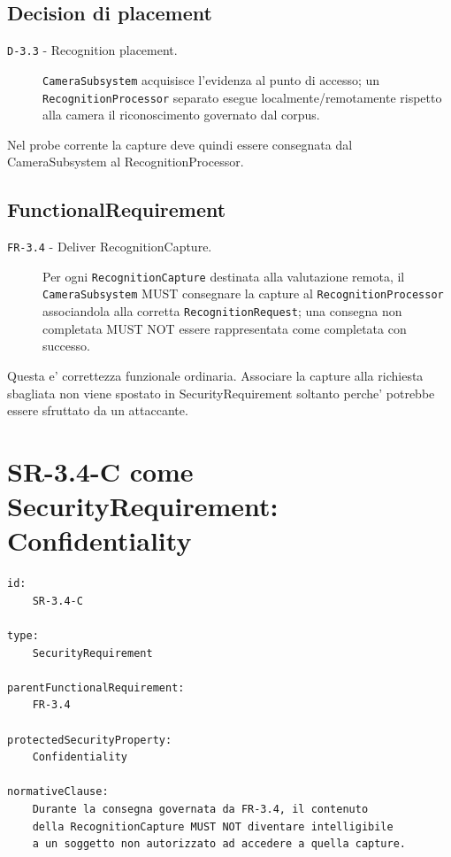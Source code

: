\documentclass[11pt,a4paper]{article}
\begin{document}
\subsection{Decision di placement}

\begin{description}
  \item[\texttt{D-3.3} - Recognition placement.] \texttt{CameraSubsystem} acquisisce l'evidenza al punto di accesso; un \texttt{RecognitionProcessor} separato esegue localmente/remotamente rispetto alla camera il riconoscimento governato dal corpus.
\end{description}

Nel probe corrente la capture deve quindi essere consegnata dal CameraSubsystem al RecognitionProcessor.

\subsection{FunctionalRequirement}

\begin{description}
  \item[\texttt{FR-3.4} - Deliver RecognitionCapture.] Per ogni \texttt{RecognitionCapture} destinata alla valutazione remota, il \texttt{CameraSubsystem} MUST consegnare la capture al \texttt{RecognitionProcessor} associandola alla corretta \texttt{RecognitionRequest}; una consegna non completata MUST NOT essere rappresentata come completata con successo.
\end{description}

Questa e' correttezza funzionale ordinaria. Associare la capture alla richiesta sbagliata non viene spostato in SecurityRequirement soltanto perche' potrebbe essere sfruttato da un attaccante.

\section{SR-3.4-C come SecurityRequirement: Confidentiality}

\begin{lstlisting}
id:
    SR-3.4-C

type:
    SecurityRequirement

parentFunctionalRequirement:
    FR-3.4

protectedSecurityProperty:
    Confidentiality

normativeClause:
    Durante la consegna governata da FR-3.4, il contenuto
    della RecognitionCapture MUST NOT diventare intelligibile
    a un soggetto non autorizzato ad accedere a quella capture.
\end{lstlisting}
\end{document}
